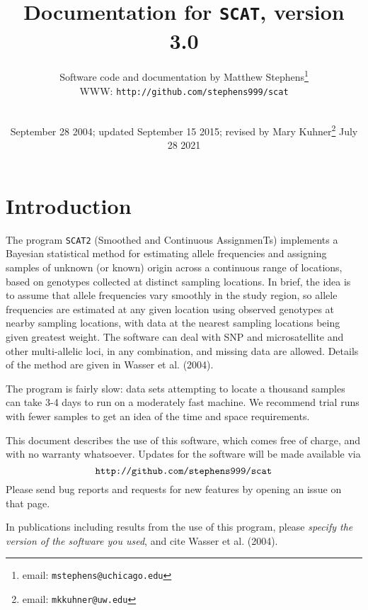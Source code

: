 \documentclass[10pt,titlepage,times,letterpaper]{article}
\def\SCAT{{\tt SCAT2} }
\begin{document}
\title{Documentation for {\tt SCAT}, version 3.0}

\author{
Software code and documentation by Matthew Stephens\footnote{email: {\tt mstephens@uchicago.edu}} \\
WWW: {\tt http://github.com/stephens999/scat}\\
\\
}

\date{September 28 2004; updated September 15 2015; revised by Mary Kuhner\footnote{email:  {\tt mkkuhner@uw.edu}} July 28 2021}


\maketitle

\tableofcontents
\vfil\eject
\section{Introduction}

The program \SCAT (Smoothed and Continuous AssignmenTs)
implements a Bayesian statistical method for estimating allele
frequencies and assigning samples of unknown (or known) origin across
a continuous range of locations, based on genotypes collected at
distinct sampling locations.  In brief, the idea is to assume that allele
frequencies vary smoothly in the study region, so allele frequencies
are estimated at any given location using observed genotypes at
nearby sampling locations, with data at the nearest sampling
locations being given greatest weight.  The software can deal with SNP
and microsatellite and other multi-allelic loci, in any combination,
and missing data are allowed. Details of the method are given in
Wasser et al. (2004).

The program is fairly slow:  data sets attempting to locate a thousand
samples can take 3-4 days to run on a moderately fast machine.  We
recommend trial runs with fewer samples to get an idea of the time and
space requirements.

This document describes the use of this software, which comes free of
charge, and with no warranty whatsoever.  Updates for the software
will be made available via
$$\text{{\tt http://github.com/stephens999/scat}}$$
Please send bug reports and requests for new features by opening an issue on that page.

In publications including results from the use of this program, please
{\it specify the version of the software you used}, and cite
Wasser et al. (2004).
\end{document}
